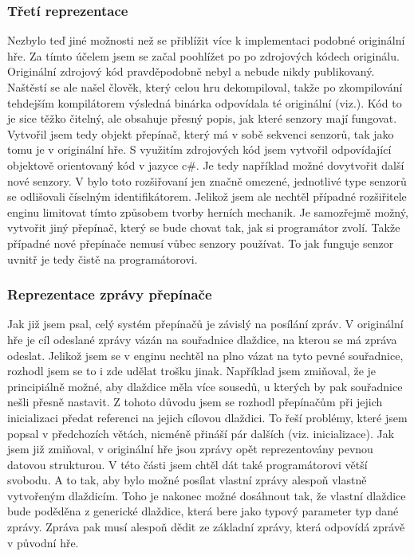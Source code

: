 \subsubsection{Třetí reprezentace}
Nezbylo teď jiné možnosti než se přiblížit více k implementaci podobné originální hře. Za tímto účelem jsem se začal poohlížet po 
po zdrojových kódech originálu. Originální zdrojový kód pravděpodobně nebyl a nebude nikdy publikovaný. Naštěstí  se ale našel člověk,
který celou hru dekompiloval, takže po zkompilování tehdejším kompilátorem výsledná binárka odpovídala té originální (viz.\cite{DMDekompilation}).
Kód to je sice těžko čitelný, ale obsahuje přesný popis, jak které senzory mají fungovat. Vytvořil jsem tedy objekt přepínač, který má v sobě sekvenci senzorů, tak jako
tomu je v originální hře. S využitím zdrojových kód jsem vytvořil odpovídající objektově orientovaný kód v jazyce c\#. Je tedy například možné 
dovytvořit další nové senzory. V bylo toto rozšiřovaní jen značně omezené, jednotlivé type senzorů se odlišovali číselným identifikátorem.
Jelikož jsem ale nechtěl případné rozšiřitele enginu limitovat tímto způsobem tvorby herních mechanik. Je samozřejmě možný, vytvořit jiný přepínač, který se bude
chovat tak, jak si programátor zvolí. Takže případné nové přepínače nemusí vůbec senzory používat. To jak funguje senzor uvnitř je tedy čistě na
programátorovi.

\subsubsection{Reprezentace zprávy přepínače}
Jak již jsem psal,  celý systém přepínačů je závislý na posílání zpráv. V originální hře je cíl odeslané zprávy vázán na souřadnice dlaždice, na kterou 
se má zpráva odeslat. Jelikož jsem se v enginu nechtěl na plno vázat na tyto pevné souřadnice, rozhodl jsem se to i 
zde udělat trošku jinak. Například jsem zmiňoval, že je principiálně možné, aby dlaždice měla více sousedů, u kterých by pak souřadnice
nešli přesně nastavit. Z tohoto důvodu jsem se rozhodl přepínačům při jejich inicializaci předat referenci na jejich cílovou dlaždici. 
To řeší problémy, které jsem popsal v předchozích větách, nicméně přináší pár dalších (viz. inicializace). Jak jsem již zmiňoval,
v originální hře jsou zprávy opět reprezentovány pevnou datovou strukturou. V této části jsem chtěl dát také programátorovi větší svobodu. 
A to tak, aby bylo možné posílat vlastní zprávy alespoň vlastně vytvořeným dlaždicím. Toho je nakonec možné dosáhnout tak, že vlastní dlaždice bude 
poděděna z generické dlaždice, která bere jako typový parameter typ dané zprávy. Zpráva pak musí alespoň dědit ze základní zprávy, která odpovídá
zprávě v původní hře.


